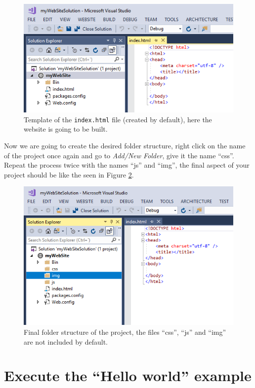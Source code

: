 \begin{figure}
    \centering
    \includegraphics[width= 0.9 \textwidth]{Figures/Projects/pro4b}
    \caption{Template of the \texttt{index.html} file (created by default), here the website is going to be built.}
    \label{fig:pro4b}
\end{figure}

\newpage
Now we are going to create the desired folder structure, right click on the name of the project once again and go to \textit{Add/New Folder}, give it the name ``css''. Repeat the process twice with the names ``js'' and ``img'', the final aspect of your project should be like the seen in Figure \ref{fig:pro5}.

\begin{figure}
    \centering
    \includegraphics[width= 0.8 \textwidth]{Figures/Projects/pro5}
    \caption{Final folder structure of the project, the files ``css'', ``js'' and ``img'' are not included by default.}
    \label{fig:pro5}
\end{figure}




    \FloatBarrier
    \section{Execute the ``Hello world'' example} \label{sec:Web}

